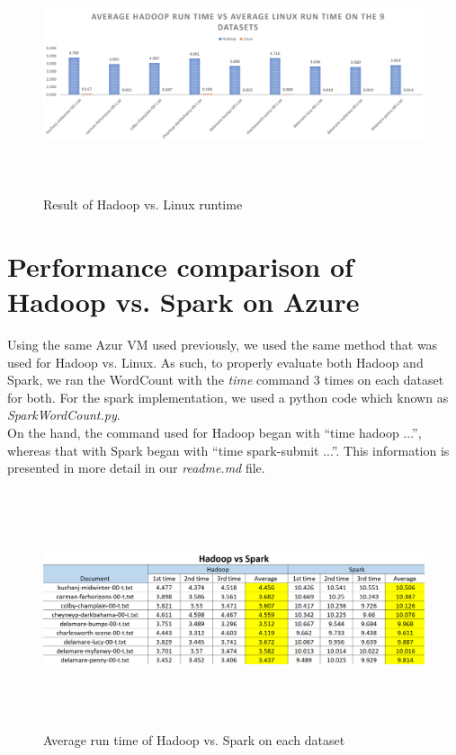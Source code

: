 \documentclass[12pt]{article}
\begin{document}
\begin{figure}[h]
    \centering
    \includegraphics[width=140mm, height=70mm, scale=1.0]{images/Hadoop_vs_Linux_graph.PNG}
    \caption{Result of Hadoop vs. Linux runtime}
    \label{fig:fig4}
\end{figure}

\newpage

\section{Performance comparison of Hadoop vs. Spark on Azure}
\noindent Using the same Azur VM used previously, we used the same method that was used for Hadoop vs. Linux. As such, to properly evaluate both Hadoop and Spark, we ran the WordCount with the \textit{time} command  3 times on each dataset for both. For the spark implementation, we used a python code which known as \textit{SparkWordCount.py}. \\


\noindent On the hand, the command used for Hadoop began with “time hadoop ...”, whereas that with Spark began with “time spark-submit ...”. This information is presented in more detail in our \textit{readme.md} file.

\begin{figure}[H]
    \centering
    \includegraphics[width=140mm, height=70mm]{images/Hadoop_vs_Spark_table.PNG}
    \caption{Average run time of Hadoop vs. Spark on each dataset}
    \label{fig:fig5}
\end{figure}
\end{document}
